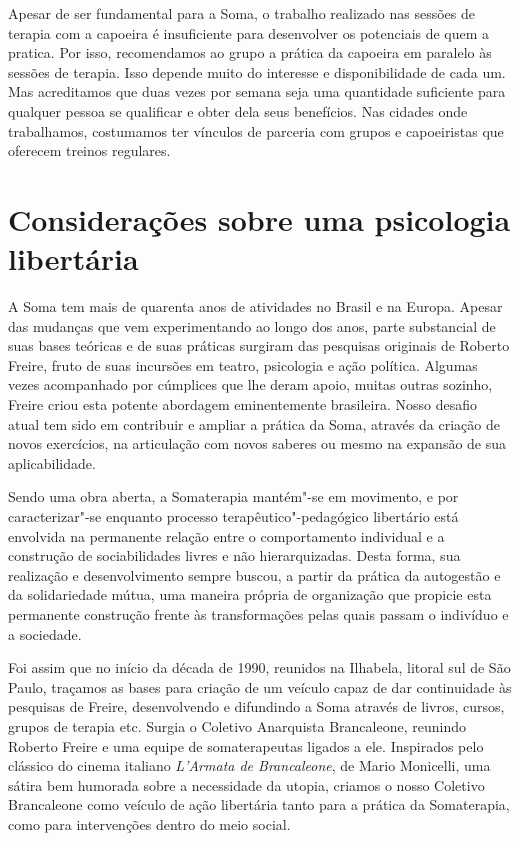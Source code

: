 Apesar de ser fundamental para a Soma, o trabalho realizado nas sessões
de terapia com a capoeira é insuficiente para desenvolver os potenciais
de quem a pratica. Por isso, recomendamos ao grupo a prática da capoeira
em paralelo às sessões de terapia. Isso depende muito do
interesse e disponibilidade de cada um. Mas acreditamos que duas vezes
por semana seja uma quantidade suficiente para qualquer pessoa se
qualificar e obter dela seus benefícios. Nas cidades onde
trabalhamos, costumamos ter vínculos de parceria com grupos e
capoeiristas que oferecem treinos regulares.

\chapter{Considerações sobre uma psicologia libertária}

A Soma tem mais de quarenta anos de atividades no Brasil e na Europa.
Apesar das mudanças que vem experimentando ao longo dos anos, parte
substancial de suas bases teóricas e de suas práticas surgiram das
pesquisas originais de Roberto Freire, fruto de suas incursões em
teatro, psicologia e ação política. Algumas vezes acompanhado por
cúmplices que lhe deram apoio, muitas outras sozinho, Freire criou esta
potente abordagem eminentemente brasileira. Nosso desafio atual tem sido
em contribuir e ampliar a prática da Soma, através da criação de novos
exercícios, na articulação com novos saberes ou mesmo na expansão de sua
aplicabilidade.

Sendo uma obra aberta, a Somaterapia mantém"-se em movimento, e por
caracterizar"-se enquanto processo terapêutico"-pedagógico libertário está
envolvida na permanente relação entre o comportamento individual e a
construção de sociabilidades livres e não hierarquizadas. Desta forma,
sua realização e desenvolvimento sempre buscou, a partir da prática da
autogestão e da solidariedade mútua, uma maneira própria de organização
que propicie esta permanente construção frente às transformações pelas quais
passam o indivíduo e a sociedade.

Foi assim que no início da década de 1990, reunidos na Ilhabela, litoral
sul de São Paulo, traçamos as bases para criação de um veículo capaz de
dar continuidade às pesquisas de Freire, desenvolvendo e difundindo a
Soma através de livros, cursos, grupos de terapia etc. Surgia o Coletivo
Anarquista Brancaleone, reunindo Roberto Freire e uma equipe de
somaterapeutas ligados a ele. Inspirados pelo clássico do cinema
italiano \emph{L'Armata de Brancaleone}, de Mario Monicelli, uma sátira
bem humorada sobre a necessidade da utopia, criamos o nosso Coletivo
Brancaleone como veículo de ação libertária tanto para a prática da
Somaterapia, como para intervenções dentro do meio social.

